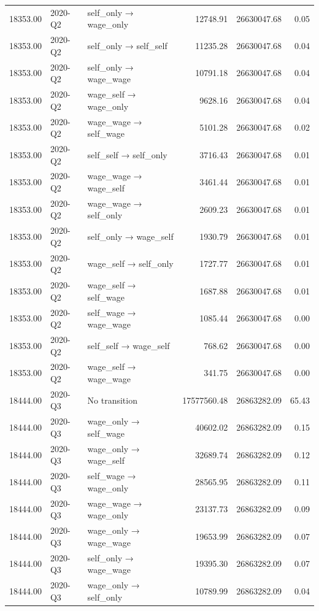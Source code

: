 \begin{table}[ht]
{\begin{tabular}{rllrrr}
  18353.00 & 2020-Q2 & self\_only → wage\_only & 12748.91 & 26630047.68 & 0.05 \\ 
  18353.00 & 2020-Q2 & self\_only → self\_self & 11235.28 & 26630047.68 & 0.04 \\ 
  18353.00 & 2020-Q2 & self\_only → wage\_wage & 10791.18 & 26630047.68 & 0.04 \\ 
  18353.00 & 2020-Q2 & wage\_self → wage\_only & 9628.16 & 26630047.68 & 0.04 \\ 
  18353.00 & 2020-Q2 & wage\_wage → self\_wage & 5101.28 & 26630047.68 & 0.02 \\ 
  18353.00 & 2020-Q2 & self\_self → self\_only & 3716.43 & 26630047.68 & 0.01 \\ 
  18353.00 & 2020-Q2 & wage\_wage → wage\_self & 3461.44 & 26630047.68 & 0.01 \\ 
  18353.00 & 2020-Q2 & wage\_wage → self\_only & 2609.23 & 26630047.68 & 0.01 \\ 
  18353.00 & 2020-Q2 & self\_only → wage\_self & 1930.79 & 26630047.68 & 0.01 \\ 
  18353.00 & 2020-Q2 & wage\_self → self\_only & 1727.77 & 26630047.68 & 0.01 \\ 
  18353.00 & 2020-Q2 & wage\_self → self\_wage & 1687.88 & 26630047.68 & 0.01 \\ 
  18353.00 & 2020-Q2 & self\_wage → wage\_wage & 1085.44 & 26630047.68 & 0.00 \\ 
  18353.00 & 2020-Q2 & self\_self → wage\_self & 768.62 & 26630047.68 & 0.00 \\ 
  18353.00 & 2020-Q2 & wage\_self → wage\_wage & 341.75 & 26630047.68 & 0.00 \\ 
  18444.00 & 2020-Q3 & No transition & 17577560.48 & 26863282.09 & 65.43 \\ 
  18444.00 & 2020-Q3 & wage\_only → self\_wage & 40602.02 & 26863282.09 & 0.15 \\ 
  18444.00 & 2020-Q3 & wage\_only → wage\_self & 32689.74 & 26863282.09 & 0.12 \\ 
  18444.00 & 2020-Q3 & self\_wage → wage\_only & 28565.95 & 26863282.09 & 0.11 \\ 
  18444.00 & 2020-Q3 & wage\_wage → wage\_only & 23137.73 & 26863282.09 & 0.09 \\ 
  18444.00 & 2020-Q3 & wage\_only → wage\_wage & 19653.99 & 26863282.09 & 0.07 \\ 
  18444.00 & 2020-Q3 & self\_only → wage\_wage & 19395.30 & 26863282.09 & 0.07 \\ 
  18444.00 & 2020-Q3 & wage\_only → self\_only & 10789.99 & 26863282.09 & 0.04 \\ 

\end{tabular}}
\end{table}
